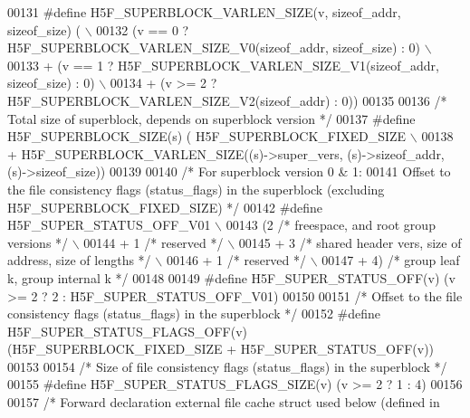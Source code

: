 \begin{DoxyCode}
00131 \textcolor{preprocessor}{#define H5F\_SUPERBLOCK\_VARLEN\_SIZE(v, sizeof\_addr, sizeof\_size) (   \(\backslash\)}
00132 \textcolor{preprocessor}{        (v == 0 ? H5F\_SUPERBLOCK\_VARLEN\_SIZE\_V0(sizeof\_addr, sizeof\_size) : 0) \(\backslash\)}
00133 \textcolor{preprocessor}{        + (v == 1 ? H5F\_SUPERBLOCK\_VARLEN\_SIZE\_V1(sizeof\_addr, sizeof\_size) : 0) \(\backslash\)}
00134 \textcolor{preprocessor}{        + (v >= 2 ? H5F\_SUPERBLOCK\_VARLEN\_SIZE\_V2(sizeof\_addr) : 0))}
00135 
00136 \textcolor{comment}{/* Total size of superblock, depends on superblock version */}
00137 \textcolor{preprocessor}{#define H5F\_SUPERBLOCK\_SIZE(s) ( H5F\_SUPERBLOCK\_FIXED\_SIZE              \(\backslash\)}
00138 \textcolor{preprocessor}{        + H5F\_SUPERBLOCK\_VARLEN\_SIZE((s)->super\_vers, (s)->sizeof\_addr, (s)->sizeof\_size))}
00139 
00140 \textcolor{comment}{/* For superblock version 0 & 1:}
00141 \textcolor{comment}{   Offset to the file consistency flags (status\_flags) in the superblock (excluding
       H5F\_SUPERBLOCK\_FIXED\_SIZE) */}
00142 \textcolor{preprocessor}{#define H5F\_SUPER\_STATUS\_OFF\_V01                                                \(\backslash\)}
00143 \textcolor{preprocessor}{        (2  }\textcolor{comment}{/* freespace, and root group versions */}\textcolor{preprocessor}{                    \(\backslash\)}
00144 \textcolor{preprocessor}{        + 1 }\textcolor{comment}{/* reserved */}\textcolor{preprocessor}{                                              \(\backslash\)}
00145 \textcolor{preprocessor}{        + 3 }\textcolor{comment}{/* shared header vers, size of address, size of lengths */}\textcolor{preprocessor}{  \(\backslash\)}
00146 \textcolor{preprocessor}{        + 1 }\textcolor{comment}{/* reserved */}\textcolor{preprocessor}{                                              \(\backslash\)}
00147 \textcolor{preprocessor}{        + 4) }\textcolor{comment}{/* group leaf k, group internal k */}\textcolor{preprocessor}{}
00148 
00149 \textcolor{preprocessor}{#define H5F\_SUPER\_STATUS\_OFF(v)   (v >= 2 ? 2 : H5F\_SUPER\_STATUS\_OFF\_V01)}
00150 
00151 \textcolor{comment}{/* Offset to the file consistency flags (status\_flags) in the superblock */}
00152 \textcolor{preprocessor}{#define H5F\_SUPER\_STATUS\_FLAGS\_OFF(v) (H5F\_SUPERBLOCK\_FIXED\_SIZE + H5F\_SUPER\_STATUS\_OFF(v))}
00153 
00154 \textcolor{comment}{/* Size of file consistency flags (status\_flags) in the superblock */}
00155 \textcolor{preprocessor}{#define H5F\_SUPER\_STATUS\_FLAGS\_SIZE(v)        (v >= 2 ? 1 : 4)}
00156 
00157 \textcolor{comment}{/* Forward declaration external file cache struct used below (defined in}

\end{DoxyCode}
